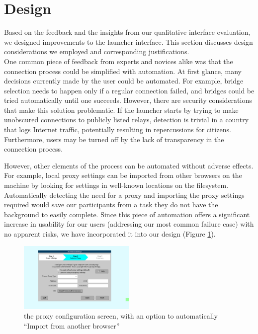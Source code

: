 \documentclass{template}
\begin{document}
\section{Design}
Based on the feedback and the insights from our qualitative interface evaluation,
 we designed improvements to the launcher interface. This section
discusses design considerations we employed and corresponding justifications. \\

One common piece of feedback from experts and novices alike was that the
connection process could be simplified with automation. At first glance, many
decisions currently made by the user could be automated. For example, bridge
selection needs to happen only if a regular connection failed, and bridges could
be tried automatically until one succeeds. However, there are security
considerations that make this solution problematic. If the launcher starts by
trying to make unobscured connections to publicly listed relays, detection is
trivial in a country that logs Internet traffic, potentially resulting in
repercussions for citizens. Furthermore, users may be turned off by the
lack of transparency in the connection process.

However, other elements of the process can be automated without adverse effects.
For example, local proxy settings can be imported from other browsers on the
machine by looking for settings in well-known locations on the filesystem. Automatically
detecting the need for a proxy and importing the proxy settings required would save
our participants from a task they do not have the background to easily complete. 
Since this piece of automation offers a significant increase in usability for our users
(addressing our most common failure case) with no apparent risks, we have incorporated it
into our design (Figure \ref{fig:redesign-proxy}). \\

\begin{figure}[h]
  \centering
    \includegraphics[width=0.5\textwidth]{redesign-proxy.png}
    \caption{the proxy configuration screen, with an option to automatically
        ``Import from another browser''}
\label{fig:redesign-proxy}
\end{figure}
\end{document}

